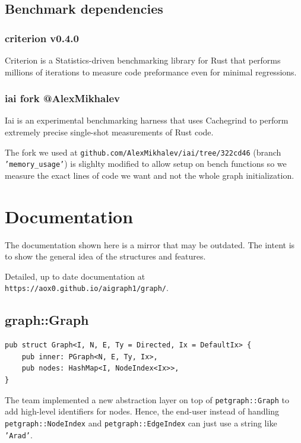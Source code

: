 \subsection{Benchmark dependencies}

\subsubsection{criterion v0.4.0}

Criterion is a Statistics-driven benchmarking library for Rust that performs millions of iterations to measure code preformance
even for minimal regressions. \autocite{criterion}
 
\subsubsection{iai fork @AlexMikhalev}

Iai is an experimental benchmarking harness that uses Cachegrind to perform extremely precise
single-shot measurements of Rust code.

The fork we used at \texttt{github.com/AlexMikhalev/iai/tree/322cd46} (branch \texttt{'memory\_usage'}) is slighlty
modified to allow setup on bench functions so we measure the exact lines of code we want and not the whole
graph initialization. \autocite{iai}

\newpage
\section{Documentation}

The documentation shown here is a mirror that may be outdated. 
The intent is to show the general idea of the structures and features.

Detailed, up to date documentation at \texttt{https://aox0.github.io/aigraph1/graph/}.

\subsection{graph::Graph}

\begin{verbatim}
pub struct Graph<I, N, E, Ty = Directed, Ix = DefaultIx> {
    pub inner: PGraph<N, E, Ty, Ix>,
    pub nodes: HashMap<I, NodeIndex<Ix>>,
}
\end{verbatim}

The team implemented a new abstraction layer on top of \texttt{petgraph::Graph} to add high-level identifiers for nodes.
Hence, the end-user instead of handling \texttt{petgraph::NodeIndex} and \texttt{petgraph::EdgeIndex} can just use a string like \texttt{'Arad'}.

